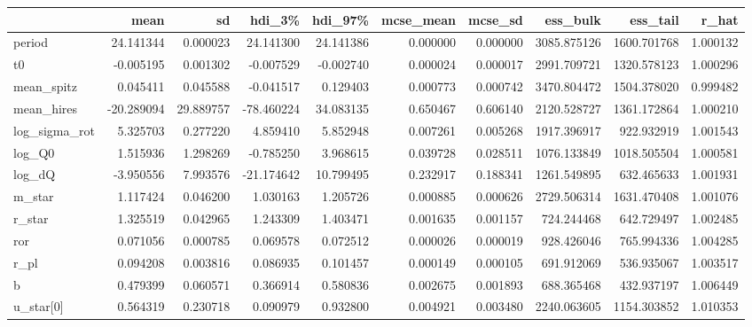 \begin{tabular}{lrrrrrrrrr}
\toprule
{} &        mean &         sd &      hdi\_3\% &     hdi\_97\% &  mcse\_mean &   mcse\_sd &     ess\_bulk &     ess\_tail &     r\_hat \\
\midrule
period        &   24.141344 &   0.000023 &   24.141300 &   24.141386 &   0.000000 &  0.000000 &  3085.875126 &  1600.701768 &  1.000132 \\
t0            &   -0.005195 &   0.001302 &   -0.007529 &   -0.002740 &   0.000024 &  0.000017 &  2991.709721 &  1320.578123 &  1.000296 \\
mean\_spitz    &    0.045411 &   0.045588 &   -0.041517 &    0.129403 &   0.000773 &  0.000742 &  3470.804472 &  1504.378020 &  0.999482 \\
mean\_hires    &  -20.289094 &  29.889757 &  -78.460224 &   34.083135 &   0.650467 &  0.606140 &  2120.528727 &  1361.172864 &  1.000210 \\
log\_sigma\_rot &    5.325703 &   0.277220 &    4.859410 &    5.852948 &   0.007261 &  0.005268 &  1917.396917 &   922.932919 &  1.001543 \\
log\_Q0        &    1.515936 &   1.298269 &   -0.785250 &    3.968615 &   0.039728 &  0.028511 &  1076.133849 &  1018.505504 &  1.000581 \\
log\_dQ        &   -3.950556 &   7.993576 &  -21.174642 &   10.799495 &   0.232917 &  0.188341 &  1261.549895 &   632.465633 &  1.001931 \\
m\_star        &    1.117424 &   0.046200 &    1.030163 &    1.205726 &   0.000885 &  0.000626 &  2729.506314 &  1631.470408 &  1.001076 \\
r\_star        &    1.325519 &   0.042965 &    1.243309 &    1.403471 &   0.001635 &  0.001157 &   724.244468 &   642.729497 &  1.002485 \\
ror           &    0.071056 &   0.000785 &    0.069578 &    0.072512 &   0.000026 &  0.000019 &   928.426046 &   765.994336 &  1.004285 \\
r\_pl          &    0.094208 &   0.003816 &    0.086935 &    0.101457 &   0.000149 &  0.000105 &   691.912069 &   536.935067 &  1.003517 \\
b             &    0.479399 &   0.060571 &    0.366914 &    0.580836 &   0.002675 &  0.001893 &   688.365468 &   432.937197 &  1.006449 \\
u\_star[0]     &    0.564319 &   0.230718 &    0.090979 &    0.932800 &   0.004921 &  0.003480 &  2240.063605 &  1154.303852 &  1.010353 \\

\end{tabular}
